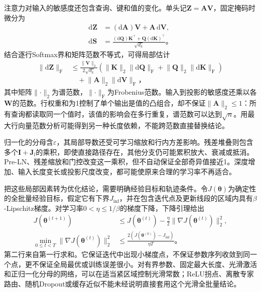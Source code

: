 注意力对输入的敏感度还包含查询、键和值的变化。单头记$\bm Z=\bm A\bm V$，固定掩码时微分为
\begin{equation}
  \begin{aligned}
    \mathrm d\bm Z&=(\mathrm d\bm A)\bm V+\bm A\,\mathrm d\bm V,\\
    \mathrm d\bm S&=\frac{(\mathrm d\bm Q)\bm K^{\top}
                              +\bm Q(\mathrm d\bm K)^{\top}}{\sqrt{d_k}}\text{。}
  \end{aligned}
  \label{eq:transformer-attention-differential}
\end{equation}
结合逐行Softmax界和矩阵范数不等式，可得局部估计
\begin{equation}
  \begin{aligned}
    \lVert\mathrm d\bm Z\rVert_{\mathrm F}
    &\leq\frac{\lVert\bm V\rVert_2}{2\sqrt{d_k}}
       \left(\lVert\bm K\rVert_2\lVert\mathrm d\bm Q\rVert_{\mathrm F}
             +\lVert\bm Q\rVert_2\lVert\mathrm d\bm K\rVert_{\mathrm F}\right)\\
    &\quad+\lVert\bm A\rVert_2\lVert\mathrm d\bm V\rVert_{\mathrm F}\text{，}
  \end{aligned}
  \label{eq:transformer-attention-local-bound}
\end{equation}
其中矩阵$\lVert\cdot\rVert_2$为谱范数，$\lVert\cdot\rVert_{\mathrm F}$为Frobenius范数。输入到投影的敏感度还乘以各$\bm W$的范数。行权重和为1控制了单个输出是值的凸组合，却不保证$\lVert\bm A\rVert_2\leq1$：所有查询都读取同一个值时，该值的影响会在多行重复，谱范数可以达到$\sqrt n$。用最大行向量范数分析可能得到另一种长度依赖，不能跨范数直接替换结论。

归一化的分母含$\varepsilon$，其局部导数还受可学习缩放和行内方差影响。残差堆叠则包含多个$\bm I+\bm J_l$的乘积，即使直接路径存在，其他分支仍可能累积放大、衰减或抵消。Pre-LN、残差缩放和门控改变这一乘积，但不自动保证全部奇异值接近1。深度增加、输入长度变长或投影尺度改变，都可能使原来合理的学习率不再适合。

把这些局部因素转为优化结论，需要明确经验目标和轨迹条件。令$J(\bm\theta)$为确定性的全批量经验目标，假定它有下界$J_{\inf}$，并在包含迭代点及更新线段的区域内具有$\beta$-Lipschitz梯度。对学习率$0<\eta\leq1/\beta$的梯度下降，下降引理给出
\begin{equation}
  \begin{aligned}
    J(\bm\theta^{(t+1)})
      &\leq J(\bm\theta^{(t)})-\frac\eta2
                   \lVert\nabla J(\bm\theta^{(t)})\rVert_2^2,\\
    \min_{0\leq t<T}\lVert\nabla J(\bm\theta^{(t)})\rVert_2^2
      &\leq\frac{2(J(\bm\theta^{(0)})-J_{\inf})}{\eta T}\text{。}
  \end{aligned}
  \label{eq:transformer-stationary-convergence}
\end{equation}
第二行来自第一行求和。它保证迭代中出现小梯度点，不保证参数序列收敛到同一个点，更不保证全局最优或训练误差很小。对有界参数、固定最大长度、光滑激活和正归一化分母的网络，可以在适当紧区域控制光滑常数；ReLU拐点、离散专家路由、随机Dropout或缓存近似不能未经说明直接套用这个光滑全批量结论。

